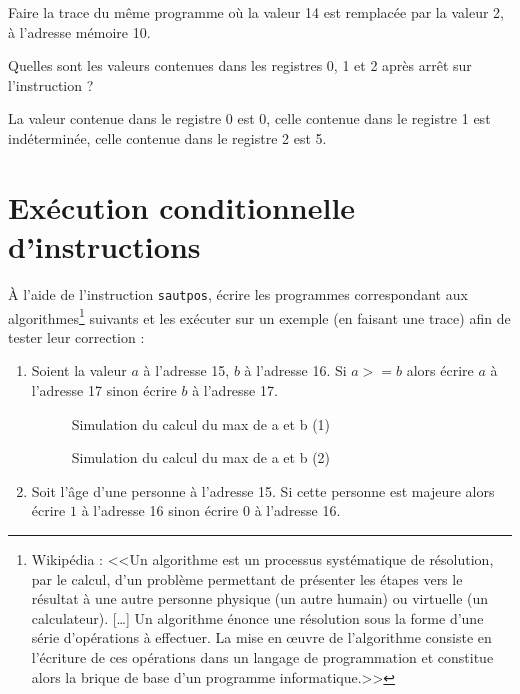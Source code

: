 Faire la trace du même programme où la valeur 14 est remplacée par la valeur 2, à l'adresse mémoire 10. 

Quelles sont les valeurs contenues dans les registres 0, 1 et 2 après arrêt sur l'instruction  ?

\begin{correction}
  

La valeur contenue dans le registre 0 est 0, celle contenue dans le registre 1 est indéterminée, celle contenue dans le registre 2 est 5.
\end{correction}

\section{Exécution conditionnelle d'instructions}

À l'aide de l'instruction \verb|sautpos|, écrire les programmes correspondant aux
algorithmes\footnote{Wikipédia : <<Un algorithme est un processus systématique de résolution, par le calcul, d'un problème permettant de présenter les étapes vers le résultat à une autre personne physique (un autre humain) ou virtuelle (un calculateur). [\ldots] Un algorithme énonce une résolution sous la forme d’une série d’opérations à effectuer. La mise en œuvre de l’algorithme consiste en l’écriture de ces opérations dans un langage de programmation et constitue alors la brique de base d’un programme informatique.>>} suivants et les exécuter sur un exemple (en faisant une trace) afin de tester leur correction :
\begin{enumerate}
\item Soient la valeur $a$ à l'adresse 15, $b$ à l'adresse 16. Si $a >= b$ alors écrire $a$ à l'adresse 17 sinon écrire $b$ à l'adresse 17.
\begin{correction}
\begin{figure} %
  \centering
 
  \caption{Simulation du calcul du max de a et b (1)}
  \label{simmax1}
\end{figure}
\begin{figure}
  \centering
  
  \caption{Simulation du calcul du max de a et b (2)}
  \label{simmax2}
\end{figure}
\end{correction}
\item Soit l'âge d'une personne à l'adresse 15. Si cette personne est majeure alors écrire $1$ à l'adresse 16 sinon écrire $0$ à l'adresse 16.
\end{enumerate}

